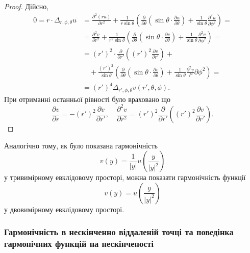 \begin{proof}
	Дійсно, 
	\begin{equation}
		\begin{aligned}
			0 = r \cdot \Delta_{r, \phi, \theta} u &= \frac{\partial^2 (ru)}{\partial r^2} + \frac{1}{r \sin \theta} \left( \frac{\partial}{\partial \theta} \left( \sin \theta \cdot \frac{\partial u}{\partial \theta} \right) + \frac{1}{\sin \theta} \frac{\partial^2 u}{\partial \phi^2} \right) = \\
			&= \frac{\partial^2 v}{\partial r^2} + \frac{1}{r^2 \sin \theta} \left( \frac{\partial}{\partial \theta} \left( \sin \theta \cdot \frac{\partial v}{\partial \theta} \right) + \frac{1}{\sin \theta} \frac{\partial^2 v}{\partial \phi^2} \right) = \\
			&= (r')^2 \cdot \frac{\partial}{\partial r'} \left( (r')^2 \frac{\partial v}{\partial r'} \right) + \\
			& \quad + \frac{(r')^2}{\sin \theta} \left( \frac{\partial}{\partial \theta} \left( \sin \theta \cdot \frac{\partial v}{\partial \theta} \right) + \frac{1}{\sin \theta} \frac{\partial^2 v}P\partial \phi^2 \right) = \\
			&= (r')^4 \Delta_{r', \phi, \theta} v(r', \theta, \phi).
		\end{aligned}
	\end{equation}
	При отриманні останньої рівності було враховано що
	\begin{equation}
		\frac{\partial v}{\partial r} = - (r')^2 \frac{\partial v}{\partial r'}, \quad \frac{\partial^2 v}{\partial r^2} = (r')^2 \frac{\partial}{\partial r'} \left( (r')^2 \frac{\partial v}{\partial r'} \right).
	\end{equation}
\end{proof}

\begin{remark}
    Аналогічно тому, як було показана гармонічність
    \begin{equation}
        v(y) = \frac{1}{|y|}  u \left( \frac{y}{|y|^2} \right)
    \end{equation}
    у тривимірному евклідовому просторі, можна показати гармонічність функції
    \begin{equation}
        v(y) = u \left( \frac{y}{|y|^2} \right)
    \end{equation}
    у двовимірному евклідовому просторі.
\end{remark}

\subsubsection{Гармонічність в нескінченно віддаленій точці та поведінка гармонічних функцій на нескінченості}

